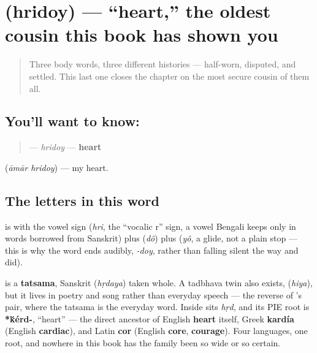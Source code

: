 \section[\texorpdfstring{\bn{হৃদয়} (hridoy)}{হৃদয় (hridoy)}]{ (hridoy) — \textquotedblleft{}heart,\textquotedblright{} the oldest cousin this book has shown you}

\label{lesson:BN-C12-hridoy}



\begin{quote}
Three body words, three different histories — half-worn, disputed, and settled. This last one closes the chapter on the most secure cousin of them all.
\end{quote}

\subsection*{You'll want to know: }
\begin{quote}
\textbf{} — \emph{hridoy} — \textbf{heart}
\end{quote}

\textbf{ } (\emph{āmār hridoy}) — my heart.

\subsection*{The letters in this word}
\textbf{} is \textbf{} with the vowel sign \textbf{} (\emph{hri}, the \textquotedblleft{}vocalic r\textquotedblright{} sign, a vowel Bengali keeps only in words borrowed from Sanskrit) plus \textbf{} (\emph{dô}) plus \textbf{} (\emph{yô}, a glide, not a plain stop — this is why the word ends audibly, \emph{-doy}, rather than falling silent the way  and  did).

\begin{cousinweb}
\textbf{} is a \textbf{tatsama}, Sanskrit \textbf{} (\emph{hṛdaya}) taken whole. A tadbhava twin also exists, \textbf{} (\emph{hiya}), but it lives in poetry and song rather than everyday speech — the reverse of 's pair, where the tatsama is the everyday word. Inside  sits \emph{hṛd}, and its PIE root is \textbf{*\'{k}érd-}, \textquotedblleft{}heart\textquotedblright{} — the direct ancestor of English \textbf{heart} itself, Greek \textbf{kardía} (English \textbf{cardiac}), and Latin \textbf{cor} (English \textbf{core}, \textbf{courage}). Four languages, one root, and nowhere in this book has the family been so wide or so certain.
\end{cousinweb}

